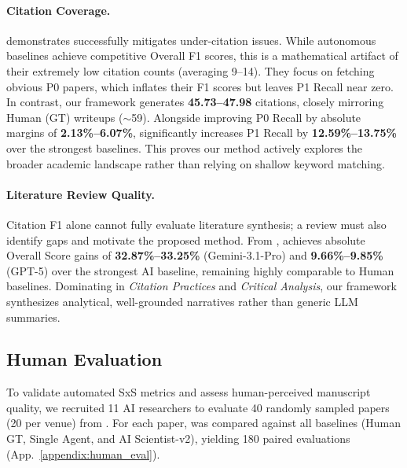 


\paragraph{Citation Coverage.}  demonstrates \ourmethod{} successfully mitigates under-citation issues. While autonomous baselines achieve competitive Overall F1 scores, this is a mathematical artifact of their extremely low citation counts (averaging 9--14). They focus on fetching obvious P0 papers, which inflates their F1 scores but leaves P1 Recall near zero. In contrast, our framework generates \textbf{45.73--47.98} citations, closely mirroring Human (GT) writeups ($\sim$59). Alongside improving P0 Recall by absolute margins of \textbf{2.13\%--6.07\%}, \ourmethod{} significantly increases P1 Recall by \textbf{12.59\%--13.75\%} over the strongest baselines. This proves our method actively explores the broader academic landscape rather than relying on shallow keyword matching.

\paragraph{Literature Review Quality.} Citation F1 alone cannot fully evaluate literature synthesis; a review must also identify gaps and motivate the proposed method. From , \ourmethod{} achieves absolute Overall Score gains of \textbf{32.87\%--33.25\%} (Gemini-3.1-Pro) and \textbf{9.66\%--9.85\%} (GPT-5) over the strongest AI baseline, remaining highly comparable to Human baselines. Dominating in \textit{Citation Practices} and \textit{Critical Analysis}, our framework synthesizes analytical, well-grounded narratives rather than generic LLM summaries.


\subsection{Human Evaluation}



To validate automated SxS metrics and assess human-perceived manuscript quality, we recruited 11 AI researchers to evaluate 40 randomly sampled papers (20 per venue) from \ourdataset{}. For each paper, \ourmethod{} was compared against all baselines (Human GT, Single Agent, and AI Scientist-v2), yielding 180 paired evaluations (App.~\ref{appendix:human_eval}).

